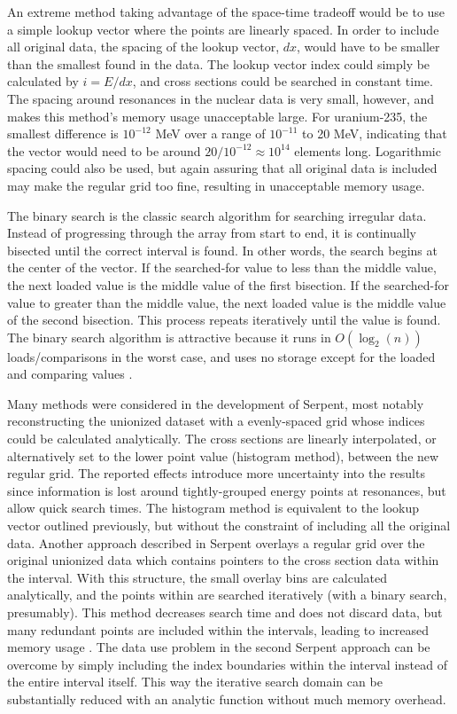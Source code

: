 An extreme method taking advantage of the space-time tradeoff would be to use a simple lookup vector where the points are linearly spaced.  In order to include all original data, the spacing of the lookup vector, $dx$, would have to be smaller than the smallest found in the data.  The lookup vector index could simply be calculated by $i=E/dx$, and cross sections could be searched in constant time.  The spacing around resonances in the nuclear data is very small, however, and makes this method's memory usage unacceptable large.  For uranium-235, the smallest difference is $10^{-12}$ MeV over a range of $10^{-11}$ to 20 MeV, indicating that the vector would need to be around $20/10^{-12} \approx 10^{14}$ elements long.  Logarithmic spacing could also be used, but again assuring that all original data is included may make the regular grid too fine, resulting in unacceptable memory usage.

The binary search is the classic search algorithm for searching irregular data.  Instead of progressing through the array from start to end, it is continually bisected until the correct interval is found.  In other words, the search begins at the center of the vector.  If the searched-for value to less than the middle value, the next loaded value is the middle value of the first bisection.  If the searched-for value to greater than the middle value, the next loaded value is the middle value of the second bisection.  This process repeats iteratively until the value is found.  The binary search algorithm is attractive because it runs in $O(\log_2(n))$ loads/comparisons in the worst case, and uses no storage except for the loaded and comparing values \cite{something}.

Many methods were considered in the development of Serpent, most notably reconstructing the unionized dataset with a evenly-spaced grid whose indices could be calculated analytically.  The cross sections are linearly interpolated, or alternatively set to the lower point value (histogram method), between the new regular grid.  The reported effects introduce more uncertainty into the results since information is lost around tightly-grouped energy points at resonances, but allow quick search times.  The histogram method is equivalent to the lookup vector outlined previously, but without the constraint of including all the original data.  Another approach described in Serpent overlays a regular grid over the original unionized data which contains pointers to the cross section data within the interval.  With this structure, the small overlay bins are calculated analytically, and the points within are searched iteratively (with a binary search, presumably).  This method decreases search time and does not discard data, but many redundant points are included within the intervals, leading to increased memory usage \cite {jaakko}.   The data use problem in the second Serpent approach can be overcome by simply including the index boundaries within the interval instead of the entire interval itself.  This way the iterative search domain can be substantially reduced with an analytic function without much memory overhead.

